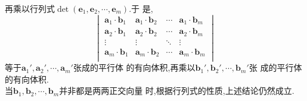 \documentclass[a4paper]{article}
\begin{document}
再乘以行列式$\det (\mathbf{e}_1,\mathbf{e}_2,\cdots,\mathbf{e}_m)$.于
是,
\begin{equation}
  \label{eq:2}
  \begin{vmatrix}
  \mathbf{a}_1\cdot \mathbf{b}_1&\mathbf{a}_1\cdot
  \mathbf{b}_2&\cdots&\mathbf{a}_1\cdot \mathbf{b}_m\\
  \mathbf{a}_2\cdot \mathbf{b}_1&\mathbf{a}_2\cdot
  \mathbf{b}_2&\cdots&\mathbf{a}_2\cdot \mathbf{b}_m\\
\vdots&\vdots&\ddots&\vdots\\
  \mathbf{a}_m\cdot \mathbf{b}_1&\mathbf{a}_m\cdot
  \mathbf{b}_2&\cdots&\mathbf{a}_m\cdot \mathbf{b}_m\\
\end{vmatrix}
\end{equation}
等于$\mathbf{a}_1',\mathbf{a}_2',\cdots,\mathbf{a}_m'$张成的平行体
的有向体积,再乘以$\mathbf{b}_1',\mathbf{b}_2',\cdots,\mathbf{b}_m'$张
成的平行体的有向体积.
\\

当$\mathbf{b}_1,\mathbf{b}_2,\cdots,\mathbf{b}_m$并非都是两两正交向量
时,根据行列式的性质,上述结论仍然成立.
\end{document}
